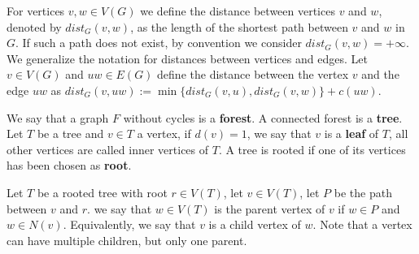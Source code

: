 For vertices \(v, w \in V(G)\) we define the distance between vertices $v$ and $w$, denoted by \(dist_G(v, w)\), as the length of the shortest path between \(v\) and \(w\) in \(G\). If such a path does not exist, by convention we consider \(dist_G(v, w) = +\infty\). We generalize the notation for distances between vertices and edges. Let \(v \in V(G)\) and \(uw \in E(G)\) define the distance between the vertex \(v\) and the edge \(uw\) as \(dist_G(v, uw) := \min\{dist_G(v, u), dist_G(v, w)\} + c(uw)\).


We say that a graph \(F\) without cycles is a \textbf{forest}. A connected forest is a \textbf{tree}. Let \(T\) be a tree and \(v \in T\) a vertex, if \(d(v) = 1\), we say that \(v\) is a \textbf{leaf} of \(T \), all other vertices are called inner vertices of \(T\). A tree is rooted if one of its vertices has been chosen as \textbf{root}.


Let \(T\) be a rooted tree with root \(r \in V(T)\), let \(v \in V(T)\), let \(P\) be the path between \(v\) and \(r\). we say that \(w \in V(T)\) is the parent vertex of \(v\) if \(w \in P\) and \(w \in N(v)\). Equivalently, we say that \(v\) is a child vertex of \(w\). Note that a vertex can have multiple children, but only one parent.


